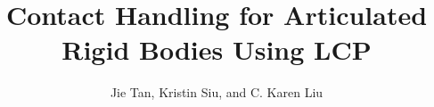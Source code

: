\documentclass[12pt, letterpaper, onecolumn]{article}
\begin{document}
\title{Contact Handling for Articulated Rigid Bodies Using LCP}
\author{Jie Tan, Kristin Siu, and C. Karen Liu}
\date{}

\maketitle







\end{document}
